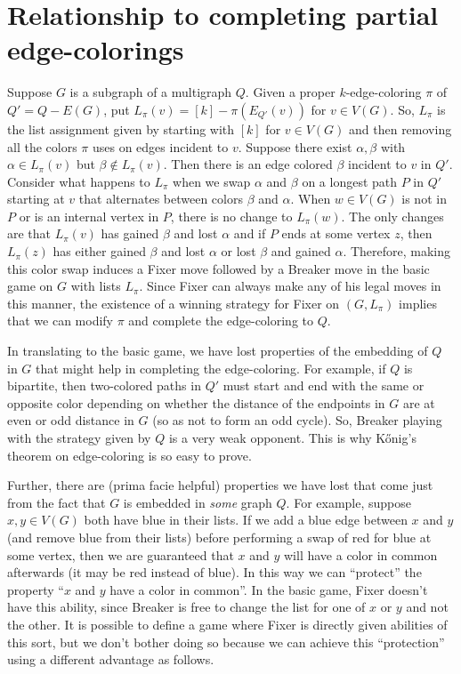\documentclass[12pt,reqno]{amsart}
\theoremstyle{plain}
\theoremstyle{definition}
\theoremstyle{remark}
\newcommand{\irange}[1]{\left[#1\right]}
\newcommand{\parens}[1]{\left( #1 \right)}
\begin{document}
\section{Relationship to completing partial edge-colorings}\label{EdgeColoringRelationshipSection}
Suppose $G$ is a subgraph of a multigraph $Q$. Given a proper $k$-edge-coloring
$\pi$ of $Q' = Q - E(G)$, put $L_\pi(v) = \irange{k} -
\pi\parens{E_{Q'}(v)}$ for $v \in V(G)$.  So, $L_\pi$ is the list assignment
given by starting with $\irange{k}$ for $v \in V(G)$ and then removing all the
colors $\pi$ uses on edges incident to $v$.  Suppose there exist $\alpha,\beta$
with $\alpha \in L_\pi(v)$ but
$\beta \not \in L_\pi(v)$.  Then there is an edge colored $\beta$ incident to
$v$ in $Q'$.  Consider what happens to $L_\pi$ when we swap $\alpha$ and
$\beta$ on a longest path $P$ in $Q'$ starting at $v$ that alternates between
colors $\beta$ and $\alpha$.  When $w \in V(G)$ is not in $P$ or is an internal
vertex in $P$, there is no change to $L_\pi(w)$.  The only changes are that
$L_\pi(v)$ has gained $\beta$ and lost $\alpha$ and if $P$ ends at some vertex
$z$, then $L_\pi(z)$ has either gained $\beta$ and lost $\alpha$ or lost
$\beta$ and gained $\alpha$.  Therefore, making this color swap induces a Fixer
move followed by a Breaker move in the basic game on $G$ with lists $L_\pi$. 
Since Fixer can always make any of his legal moves in this manner, the
existence of a winning strategy for Fixer on $(G, L_\pi)$ implies that we can
modify $\pi$ and complete the edge-coloring to $Q$.  

In translating to the basic game, we have lost properties of the embedding of $Q$ in $G$ that might help in completing the edge-coloring.  For example, if $Q$ is bipartite, then two-colored paths in $Q'$  must start and end with the same or opposite color depending on whether the distance of the endpoints in $G$ are at even or odd distance in $G$ (so as not to form an odd cycle).  So, Breaker playing with the strategy given by $Q$ is a very weak opponent. This is why K\H{o}nig's theorem on edge-coloring is so easy to prove.

Further, there are (prima facie helpful) properties we have lost that come just
from the fact that $G$ is embedded in \emph{some} graph $Q$.  For example,
suppose $x, y \in V(G)$ both have blue in their lists.  If we add a blue edge
between $x$ and $y$ (and remove blue from their lists) before performing a swap
of red for blue at some vertex, then we are guaranteed that $x$ and $y$ will
have a color in common afterwards (it may be red instead of blue).  In this way
we can ``protect'' the property ``$x$ and $y$ have a color in common''.  In the
basic game, Fixer doesn't have this ability, since Breaker is free to change
the list for one of
$x$ or $y$ and not the other.  It is possible to define a game where Fixer is
directly given abilities of this sort, but we don't bother doing so because we
can achieve this ``protection'' using a different advantage as
follows.
\end{document}
